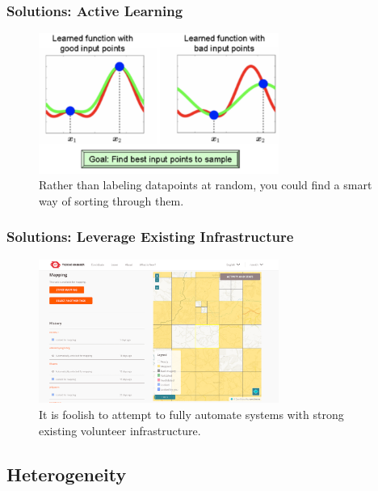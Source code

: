 \documentclass[10pt,mathserif]{beamer}
\begin{document}
\begin{frame}
  \frametitle{Solutions: Active Learning}
  \begin{figure}[ht]
    \centering
    \includegraphics[width=0.7\textwidth]{figures/active_learning}
    \caption{Rather than labeling datapoints at random, you could find a smart
      way of sorting through them. \label{fig:label} }
  \end{figure}
\end{frame}

\begin{frame}
  \frametitle{Solutions: Leverage Existing Infrastructure}
  \begin{figure}[ht]
    \centering
    \includegraphics[width=0.7\textwidth]{figures/hotosm}
    \caption{It is foolish to attempt to fully automate systems with strong
      existing volunteer infrastructure. \label{fig:label} }
  \end{figure}
\end{frame}

\subsection{Heterogeneity}
\label{subsec:label}
\end{document}
